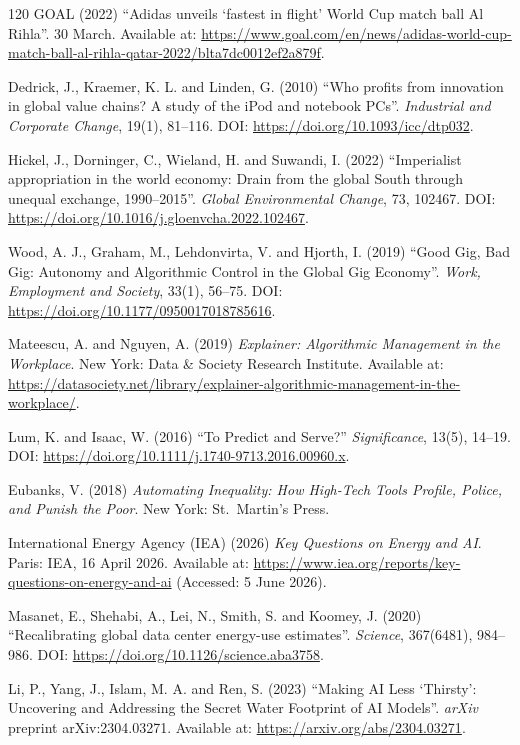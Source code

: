 \begin{singlespace}
\begin{thebibliography}{120}
GOAL (2022)
``Adidas unveils `fastest in flight' World Cup match ball Al Rihla''.
30 March.
Available at: \url{https://www.goal.com/en/news/adidas-world-cup-match-ball-al-rihla-qatar-2022/blta7dc0012ef2a879f}.

Dedrick, J., Kraemer, K. L. and Linden, G. (2010) ``Who profits from innovation in global value chains? A study of the iPod and notebook PCs''.
\emph{Industrial and Corporate Change}, 19(1), 81--116.
DOI: \url{https://doi.org/10.1093/icc/dtp032}.

Hickel, J., Dorninger, C., Wieland, H. and Suwandi, I. (2022) ``Imperialist appropriation in the world economy: Drain from the global South through unequal exchange, 1990--2015''. \emph{Global Environmental Change}, 73, 102467. DOI: \url{https://doi.org/10.1016/j.gloenvcha.2022.102467}.

Wood, A. J., Graham, M., Lehdonvirta, V. and Hjorth, I. (2019) ``Good Gig, Bad Gig: Autonomy and Algorithmic Control in the Global Gig Economy''.
\emph{Work, Employment and Society}, 33(1), 56--75.
DOI: \url{https://doi.org/10.1177/0950017018785616}.

Mateescu, A. and Nguyen, A. (2019)
\emph{Explainer: Algorithmic Management in the Workplace}.
New York: Data \& Society Research Institute.
Available at:
\url{https://datasociety.net/library/explainer-algorithmic-management-in-the-workplace/}.

Lum, K. and Isaac, W. (2016)
``To Predict and Serve?''
\emph{Significance}, 13(5), 14--19.
DOI: \url{https://doi.org/10.1111/j.1740-9713.2016.00960.x}.

Eubanks, V. (2018)
\emph{Automating Inequality: How High-Tech Tools Profile, Police, and Punish the Poor}.
New York: St.\ Martin's Press.

International Energy Agency (IEA) (2026) \emph{Key Questions on Energy and AI}.
Paris: IEA, 16 April 2026.
Available at:
\url{https://www.iea.org/reports/key-questions-on-energy-and-ai}
(Accessed: 5 June 2026).

Masanet, E., Shehabi, A., Lei, N., Smith, S. and Koomey, J. (2020)
``Recalibrating global data center energy-use estimates''.
\emph{Science}, 367(6481), 984--986.
DOI: \url{https://doi.org/10.1126/science.aba3758}.

Li, P., Yang, J., Islam, M. A. and Ren, S. (2023)
\enquote{Making AI Less \enquote{Thirsty}: Uncovering and Addressing the Secret
Water Footprint of AI Models}.
\emph{arXiv} preprint arXiv:2304.03271.
Available at: \url{https://arxiv.org/abs/2304.03271}.


\end{thebibliography}
\end{singlespace}
